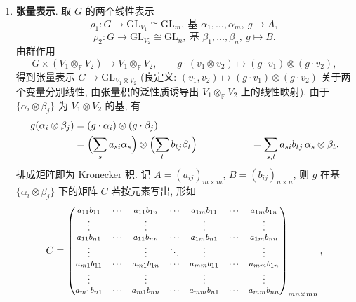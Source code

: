 \begin{example}
\begin{enumerate}
\item \textbf{张量表示}. 取 $G$ 的两个线性表示
\begin{equation*}
  \rho_1\colon G\to\mathrm{GL}_{V_1}\cong\mathrm{GL}_m,\ \text{基 } \alpha_1,\dots,\alpha_m,\ g\mapsto A,
\end{equation*}
\begin{equation*}
  \rho_2\colon G\to\mathrm{GL}_{V_2}\cong\mathrm{GL}_n,\ \text{基 } \beta_1,\dots,\beta_n,\ g\mapsto B .
\end{equation*}
由群作用
\begin{equation*}
  G\times(V_1\otimes_{\mathbb{F}} V_2)\longrightarrow V_1\otimes_{\mathbb{F}} V_2,\qquad
  g\cdot(v_1\otimes v_2)\longmapsto(g\cdot v_1)\otimes(g\cdot v_2),
\end{equation*}
得到张量表示 $G\to\mathrm{GL}_{V_1\otimes V_2}$ (良定义: $(v_1,v_2)\mapsto(g\cdot v_1)\otimes(g\cdot v_2)$
关于两个变量分别线性, 由张量积的泛性质诱导出 $V_1\otimes_{\mathbb{F}}V_2$ 上的线性映射).
由于 $\{\alpha_i\otimes\beta_j\}$ 为 $V_1\otimes V_2$ 的基, 有
\[\begin{aligned}
  &g(\alpha_i\otimes\beta_j)=(g\cdot\alpha_i)\otimes(g\cdot\beta_j)\\
  &\phantom{g(\alpha_i\otimes\beta_j)}=\Bigl(\sum_s a_{si}\alpha_s\Bigr)\otimes\Bigl(\sum_t b_{tj}\beta_t\Bigr)
  &\phantom{g(\alpha_i\otimes\beta_j)}=\sum_{s,t}a_{si}b_{tj}\,\alpha_s\otimes\beta_t .
\end{aligned}\]
排成矩阵即为 Kronecker 积. 记 $A=(a_{ij})_{m\times m}$, $B=(b_{ij})_{n\times n}$,
则 $g$ 在基 $\{\alpha_i\otimes\beta_j\}$ 下的矩阵 $C$ 若按元素写出, 形如
\begin{equation*}
  \footnotesize
  C=
  \begin{pmatrix}
    a_{11}b_{11} & \cdots & a_{11}b_{1n} & \cdots & a_{1m}b_{11} & \cdots & a_{1m}b_{1n}\\
    \vdots & & \vdots & & \vdots & & \vdots\\
    a_{11}b_{n1} & \cdots & a_{11}b_{nn} & \cdots & a_{1m}b_{n1} & \cdots & a_{1m}b_{nn}\\
    \vdots & & \vdots & \ddots & \vdots & & \vdots\\
    a_{m1}b_{11} & \cdots & a_{m1}b_{1n} & \cdots & a_{mm}b_{11} & \cdots & a_{mm}b_{1n}\\
    \vdots & & \vdots & & \vdots & & \vdots\\
    a_{m1}b_{n1} & \cdots & a_{m1}b_{nn} & \cdots & a_{mm}b_{n1} & \cdots & a_{mm}b_{nn}
  \end{pmatrix}_{mn\times mn},
\end{equation*}

\end{enumerate}
\end{example}
